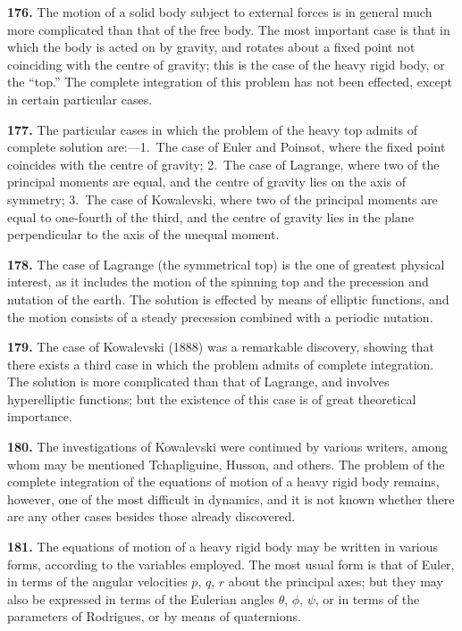 \documentclass[11pt,a4paper]{article}
\theoremstyle{definition}
\begin{document}
\textbf{176.} The motion of a solid body subject to external forces is in general much more complicated than that of the free body. The most important case is that in which the body is acted on by gravity, and rotates about a fixed point not coinciding with the centre of gravity; this is the case of the heavy rigid body, or the ``top.'' The complete integration of this problem has not been effected, except in certain particular cases.

\textbf{177.} The particular cases in which the problem of the heavy top admits of complete solution are:---1.\ The case of Euler and Poinsot, where the fixed point coincides with the centre of gravity; 2.\ The case of Lagrange, where two of the principal moments are equal, and the centre of gravity lies on the axis of symmetry; 3.\ The case of Kowalevski, where two of the principal moments are equal to one-fourth of the third, and the centre of gravity lies in the plane perpendicular to the axis of the unequal moment.

\textbf{178.} The case of Lagrange (the symmetrical top) is the one of greatest physical interest, as it includes the motion of the spinning top and the precession and nutation of the earth. The solution is effected by means of elliptic functions, and the motion consists of a steady precession combined with a periodic nutation.

\textbf{179.} The case of Kowalevski (1888) was a remarkable discovery, showing that there exists a third case in which the problem admits of complete integration. The solution is more complicated than that of Lagrange, and involves hyperelliptic functions; but the existence of this case is of great theoretical importance.

\textbf{180.} The investigations of Kowalevski were continued by various writers, among whom may be mentioned Tchapliguine, Husson, and others. The problem of the complete integration of the equations of motion of a heavy rigid body remains, however, one of the most difficult in dynamics, and it is not known whether there are any other cases besides those already discovered.

\textbf{181.} The equations of motion of a heavy rigid body may be written in various forms, according to the variables employed. The most usual form is that of Euler, in terms of the angular velocities $p$, $q$, $r$ about the principal axes; but they may also be expressed in terms of the Eulerian angles $\theta$, $\phi$, $\psi$, or in terms of the parameters of Rodrigues, or by means of quaternions.
\end{document}
